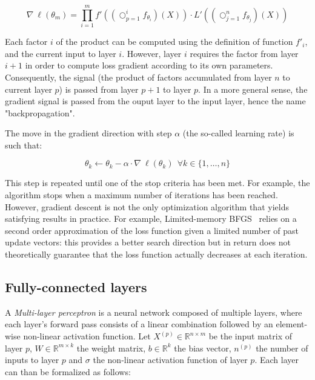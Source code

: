         \begin{equation} \label{eq:loss}
            \nabla \ \ell(\theta_m) = \prod_{i=1}^m f'((\bigcirc_{p=1}^{i} f_{\theta_i})(X)) \cdot L'((\bigcirc_{j=1}^{n} f_{\theta_j})(X))
        \end{equation}

        Each factor $i$ of the product can be computed using the definition of function $f'_i$, and the current input to layer $i$.
        However, layer $i$ requires the factor from layer $i+1$ in order to compute loss gradient according to its own parameters.
        Consequently, the signal (the product of factors accumulated from layer $n$ to current layer $p$) is passed from layer $p+1$ to layer $p$.
        In a more general sense, the gradient signal is passed from the ouput layer to the input layer, hence the name "backpropagation".

        The move in the gradient direction with step $\alpha$ (the so-called learning rate) is such that:

        \begin{equation}
            \theta_k \leftarrow \theta_k - \alpha \cdot \nabla \ \ell(\theta_k) \  \ \forall k \in \{1, \ldots, n\}
        \end{equation}

        This step is repeated until one of the stop criteria has been met. For example, the algorithm stops when a maximum number of iterations has been
        reached. However, gradient descent is not the only optimization algorithm that yields satisfying results in practice.
        For example, Limited-memory BFGS~\cite{LBFGS} relies on a second order approximation of the loss function given a limited number of past
        update vectors: this provides a better search direction but in return does not theoretically guarantee that the loss function actually decreases at each
        iteration.

    \subsection{Fully-connected layers}

        A \textit{Multi-layer perceptron} is a neural network composed of multiple layers,
        where each layer's forward pass consists of a linear combination
        followed by an element-wise non-linear activation function.
        Let $X^{(p)} \in \mathbb{R}^{n \times m}$ be the input matrix of layer $p$,
        $W \in \mathbb{R}^{m \times k}$ the weight matrix,
        $b \in \mathbb{R}^{k}$ the bias vector, $n^{(p)}$ the number of inputs to layer $p$
        and $\sigma$ the non-linear activation function of layer $p$.
        Each layer can than be formalized as follows:

